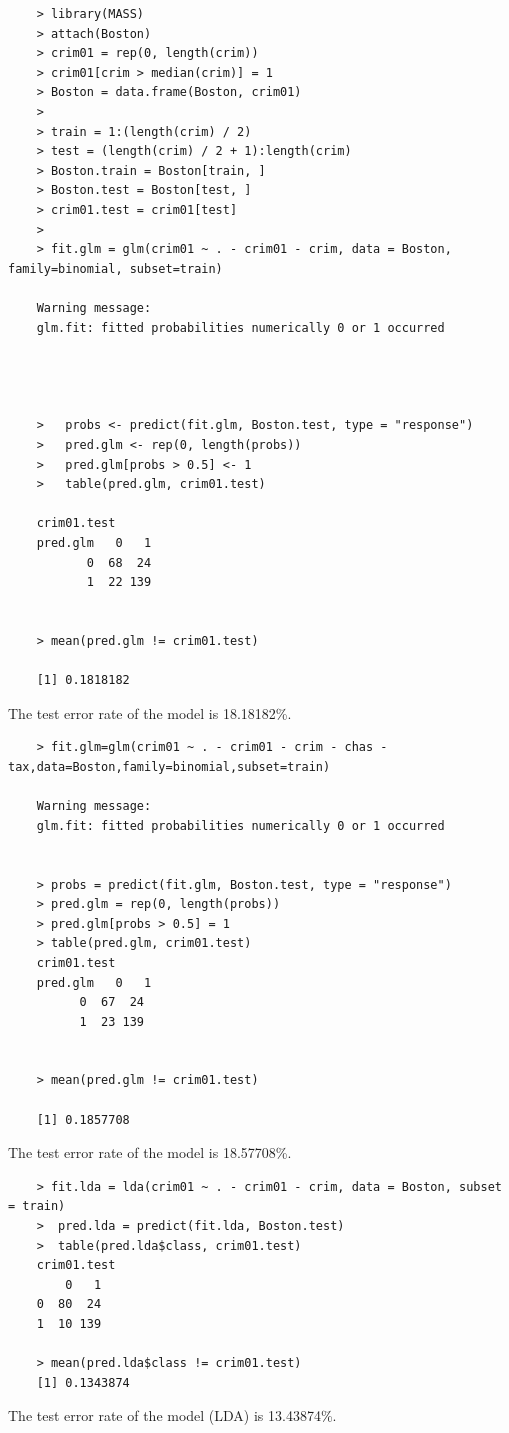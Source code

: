 \documentclass{article}
\begin{document}
\begin{program}
	\begin{verbatim}
	> library(MASS)	
	> attach(Boston)
	> crim01 = rep(0, length(crim)) 
	> crim01[crim > median(crim)] = 1 
	> Boston = data.frame(Boston, crim01)
	>  
	> train = 1:(length(crim) / 2)
	> test = (length(crim) / 2 + 1):length(crim)
	> Boston.train = Boston[train, ]
	> Boston.test = Boston[test, ]
	> crim01.test = crim01[test]
	> 
	> fit.glm = glm(crim01 ~ . - crim01 - crim, data = Boston, family=binomial, subset=train)
	
	Warning message:
	glm.fit: fitted probabilities numerically 0 or 1 occurred 
	
	
	
	
	> 	probs <- predict(fit.glm, Boston.test, type = "response")
	> 	pred.glm <- rep(0, length(probs))
	> 	pred.glm[probs > 0.5] <- 1
	> 	table(pred.glm, crim01.test)
	
	crim01.test
	pred.glm   0   1
	       0  68  24
	       1  22 139
	
	
	> mean(pred.glm != crim01.test)
	
	[1] 0.1818182	
	\end{verbatim}
\end{program}

The test error rate of the model is 18.18182\%. 
\newpage




\begin{program}
	\begin{verbatim}
	> fit.glm=glm(crim01 ~ . - crim01 - crim - chas - tax,data=Boston,family=binomial,subset=train)
	
	Warning message:
	glm.fit: fitted probabilities numerically 0 or 1 occurred 
	
	
	> probs = predict(fit.glm, Boston.test, type = "response")
	> pred.glm = rep(0, length(probs))
	> pred.glm[probs > 0.5] = 1
	> table(pred.glm, crim01.test)
	crim01.test
	pred.glm   0   1
	      0  67  24
	      1  23 139
	
	
	> mean(pred.glm != crim01.test)
	
	[1] 0.1857708
	\end{verbatim}
\end{program}
The test error rate of the model  is 18.57708\%.\\


\begin{program}
	\begin{verbatim}
	> fit.lda = lda(crim01 ~ . - crim01 - crim, data = Boston, subset = train)
	>  pred.lda = predict(fit.lda, Boston.test)
	>  table(pred.lda$class, crim01.test)
	crim01.test
	    0   1
	0  80  24
	1  10 139
				
	> mean(pred.lda$class != crim01.test)
	[1] 0.1343874
	\end{verbatim}
\end{program}
The test error rate of the model (LDA)  is 13.43874\%.\\
\end{document}
